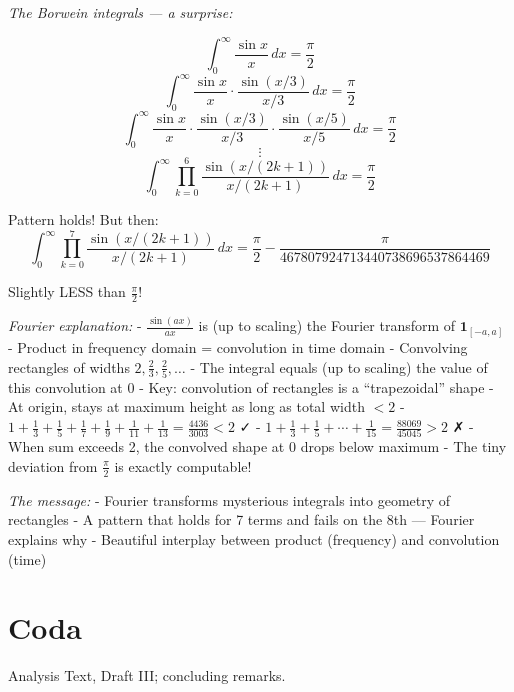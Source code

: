 \documentclass[
  10pt,
  letterpaper,
]{scrbook}
\begin{document}
\emph{The Borwein integrals --- a surprise:}

\[\int_0^\infty \frac{\sin x}{x}\, dx = \frac{\pi}{2}\]
\[\int_0^\infty \frac{\sin x}{x} \cdot \frac{\sin(x/3)}{x/3}\, dx = \frac{\pi}{2}\]
\[\int_0^\infty \frac{\sin x}{x} \cdot \frac{\sin(x/3)}{x/3} \cdot \frac{\sin(x/5)}{x/5}\, dx = \frac{\pi}{2}\]
\[\vdots\]
\[\int_0^\infty \prod_{k=0}^{6} \frac{\sin(x/(2k+1))}{x/(2k+1)}\, dx = \frac{\pi}{2}\]

Pattern holds! But then:
\[\int_0^\infty \prod_{k=0}^{7} \frac{\sin(x/(2k+1))}{x/(2k+1)}\, dx = \frac{\pi}{2} - \frac{\pi}{467807924713440738696537864469}\]

Slightly LESS than \(\frac{\pi}{2}\)!

\emph{Fourier explanation:} - \(\frac{\sin(ax)}{ax}\) is (up to scaling)
the Fourier transform of \(\mathbf{1}_{[-a,a]}\) - Product in frequency
domain = convolution in time domain - Convolving rectangles of widths
\(2, \frac{2}{3}, \frac{2}{5}, \ldots\) - The integral equals (up to
scaling) the value of this convolution at 0 - Key: convolution of
rectangles is a ``trapezoidal'' shape - At origin, stays at maximum
height as long as total width \(< 2\) -
\(1 + \frac{1}{3} + \frac{1}{5} + \frac{1}{7} + \frac{1}{9} + \frac{1}{11} + \frac{1}{13} = \frac{4436}{3003} < 2\)
✓ -
\(1 + \frac{1}{3} + \frac{1}{5} + \cdots + \frac{1}{15} = \frac{88069}{45045} > 2\)
✗ - When sum exceeds 2, the convolved shape at 0 drops below maximum -
The tiny deviation from \(\frac{\pi}{2}\) is exactly computable!

\emph{The message:} - Fourier transforms mysterious integrals into
geometry of rectangles - A pattern that holds for 7 terms and fails on
the 8th --- Fourier explains why - Beautiful interplay between product
(frequency) and convolution (time)


\chapter*{Coda}\label{coda}


Analysis Text, Draft III; concluding remarks.


\backmatter
\end{document}
